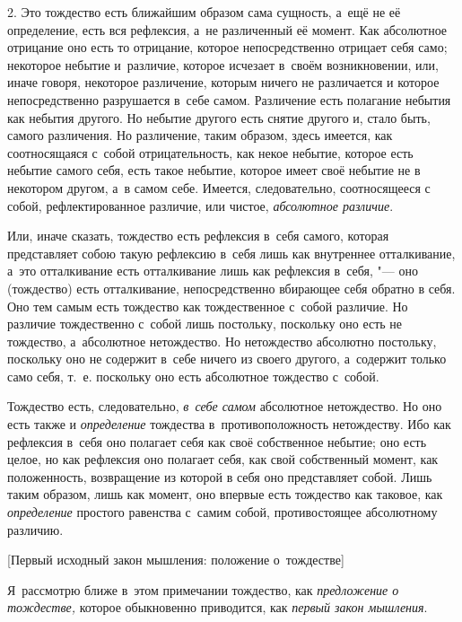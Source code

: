 2. Это тождество есть ближайшим образом сама сущность, а~ещё не её
определение, есть вся рефлексия, а~не различенный её момент. Как абсолютное
отрицание оно есть то отрицание, которое непосредственно отрицает себя
само; некоторое небытие и~различие, которое исчезает в~своём возникновении,
или, иначе говоря, некоторое различение, которым ничего не различается и
которое непосредственно разрушается в~себе самом. Различение есть полагание
небытия как небытия другого. Но небытие другого есть снятие другого и,
стало быть, самого различения. Но различение, таким образом, здесь имеется,
как соотносящаяся с~собой отрицательность, как некое небытие, которое есть
небытие самого себя, есть такое небытие, которое имеет своё небытие не в
некотором другом, а~в самом себе. Имеется, следовательно, соотносящееся с
собой, рефлектированное различие, или чистое,
{\em абсолютное различие}.

Или, иначе сказать, тождество есть рефлексия в~себя самого, которая
представляет собою такую рефлексию в~себя лишь как внутреннее отталкивание,
а~это отталкивание есть отталкивание лишь как рефлексия в~себя, "--- оно
(тождество) есть отталкивание, непосредственно вбирающее себя обратно в
себя. Оно тем самым есть тождество как тождественное с~собой различие. Но
различие тождественно с~собой лишь постольку, поскольку оно есть не
тождество, а~абсолютное нетождество. Но нетождество абсолютно постольку,
поскольку оно не содержит в~себе ничего из своего другого, а~содержит
только само себя, т.~е. поскольку оно есть абсолютное тождество с~собой.

Тождество есть, следовательно, {\em в~себе самом}
абсолютное нетождество. Но оно есть также и
{\em определение} тождества в~противоположность
нетождеству. Ибо как рефлексия в~себя оно полагает себя как своё
собственное небытие; оно есть целое, но как рефлексия оно полагает себя,
как свой собственный момент, как положенность, возвращение из которой в
себя оно представляет собой. Лишь таким образом, лишь как момент, оно
впервые есть тождество как таковое, как
{\em определение} простого равенства с~самим собой,
противостоящее абсолютному различию.

%
  {[Первый исходный закон мышления: положение о~тождестве]}

Я~рассмотрю ближе в~этом примечании тождество, как {\em предложение о
тождестве,} которое обыкновенно приводится, как {\em первый закон мышления}.


